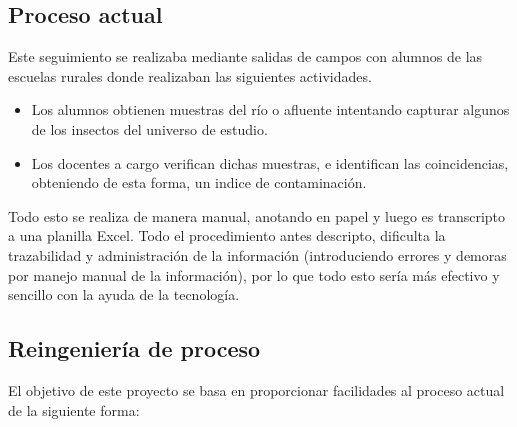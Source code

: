     \subsection{Proceso actual}

      Este seguimiento se realizaba mediante salidas de campos con alumnos de las escuelas rurales donde realizaban las siguientes actividades.
      
      \begin{itemize}
        \item Los alumnos obtienen muestras del río o afluente intentando capturar algunos de los insectos del universo de estudio.
        
        \item Los docentes a cargo verifican dichas muestras, e identifican las coincidencias, obteniendo de esta forma, un indice de contaminación.  
      \end{itemize}
      
      Todo esto se realiza de manera manual, anotando en papel y luego es transcripto a una planilla Excel.
      Todo el procedimiento antes descripto, dificulta la trazabilidad y administración de la información (introduciendo errores y demoras por manejo manual de la información), por lo que todo esto sería más efectivo y sencillo con la ayuda de la tecnología.

    \subsection{Reingeniería de proceso}

      El objetivo de este proyecto se basa en proporcionar facilidades al proceso actual de la siguiente forma: 

